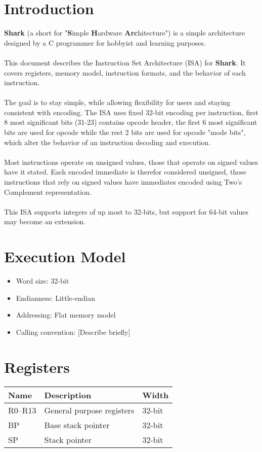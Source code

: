 \documentclass[a4paper,12pt]{article}
\begin{document}
\section{Introduction}
\textbf{Shark} (a short for "\textbf{S}imple \textbf{H}ardware \textbf{Arc}hitecture") is a simple architecture designed by 
a C programmer for hobbyist and learning purposes.\\
\\
This document describes the Instruction Set Architecture (ISA) for \textbf{Shark}.
It covers registers, memory model, instruction formats, and the behavior of each instruction.\\
\\
The goal is to stay simple, while allowing flexibility for users and staying consistent
with encoding. The ISA uses fixed 32-bit encoding per instruction, first 8 most significant bits (31-23)
contains opcode header, the first 6 most significant bits are used for opcode while the rest 2 bits are used
for opcode "mode bits", which alter the behavior of an instruction decoding and execution.\\
\\
Most instructions operate on unsigned values, those that operate on signed values have it stated.
Each encoded immediate is therefor considered unsigned, those instructions that rely on
signed values have immediates encoded using Two's Complement representation.\\
\\
This ISA supports integers of up most to 32-bits, but support for 64-bit values may become an extension.

\newpage
\section{Execution Model}
\begin{itemize}
  \item Word size: 32-bit
  \item Endianness: Little-endian
  \item Addressing: Flat memory model
  \item Calling convention: [Describe briefly]
\end{itemize}

\newpage
\section{Registers}
\begin{tabular}{@{}lll@{}}
\toprule
Name & Description & Width \\
\midrule
R0--R13 & General purpose registers & 32-bit \\
BP      & Base stack pointer        & 32-bit \\
SP      & Stack pointer             & 32-bit \\
\bottomrule
\end{tabular}
\end{document}
